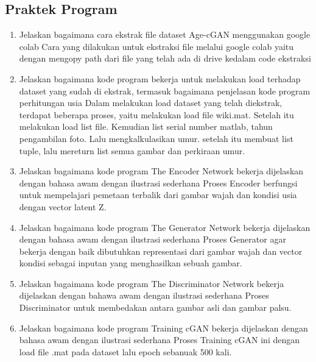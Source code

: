 \subsection{Praktek Program}
\begin{enumerate}
	\item  Jelaskan bagaimana cara ekstrak file dataset Age-cGAN menggunakan google colab
    \hfill\break
    Cara yang dilakukan untuk ekstraksi file melalui google colab yaitu dengan mengopy path dari file yang telah ada di drive kedalam code ekstraksi
    
	
	\item  Jelaskan bagaimana kode program bekerja untuk melakukan load terhadap dataset yang sudah di ekstrak, termasuk bagaimana penjelasan kode program perhitungan usia
    \hfill\break
    Dalam melakukan load dataset yang telah diekstrak, terdapat beberapa proses, yaitu melakukan load file wiki.mat. Setelah itu melakukan load list file. Kemudian list serial number matlab, tahun pengambilan foto. Lalu mengkalkulasikan umur. setelah itu membuat list tuple, lalu mereturn list semua gambar dan perkiraan umur.
    
    
    
	\item  Jelaskan bagaimana kode program The Encoder Network bekerja dijelaskan dengan bahasa awam dengan ilustrasi sederhana
    \hfill\break
    Proses Encoder berfungsi untuk mempelajari pemetaan terbalik dari gambar wajah dan kondisi usia dengan vector latent Z.
	
	

	\item Jelaskan bagaimana kode program The Generator Network bekerja dijelaskan dengan bahasa awam dengan ilustrasi sederhana
    \hfill\break
    Proses Generator agar bekerja dengan baik dibutuhkan representasi dari gambar wajah dan vector kondisi sebagai inputan yang menghasilkan sebuah gambar.
    

	\item Jelaskan bagaimana kode program The Discriminator Network bekerja dijelaskan dengan bahawa awam dengan ilustrasi sederhana
    \hfill\break
    Proses Discriminator untuk membedakan antara gambar asli dan gambar palsu.
    

	\item Jelaskan bagaimana kode program Training cGAN bekerja dijelaskan dengan bahasa awam dengan ilustrasi sederhana
    \hfill\break
    Proses Training cGAN ini dengan load file .mat pada dataset lalu epoch sebanuak 500 kali.
    
	

\end{enumerate}
